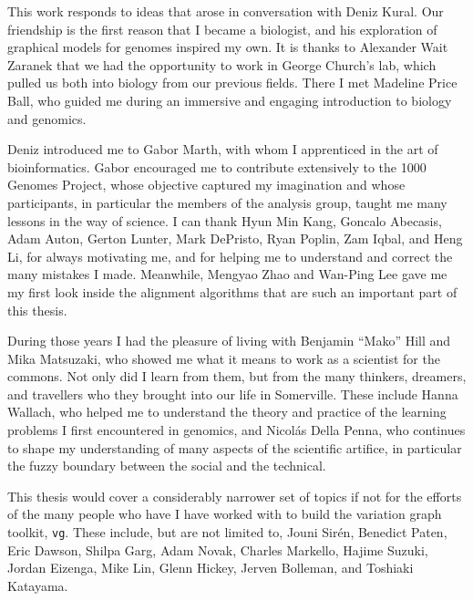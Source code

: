 
\begin{acknowledgements}      

  This work responds to ideas that arose in conversation with Deniz Kural.
  Our friendship is the first reason that I became a biologist, and his exploration of graphical models for genomes inspired my own.
  It is thanks to Alexander Wait Zaranek that we had the opportunity to work in George Church's lab, which pulled us both into biology from our previous fields.
  There I met Madeline Price Ball, who guided me during an immersive and engaging introduction to biology and genomics.
  
  Deniz introduced me to Gabor Marth, with whom I apprenticed in the art of bioinformatics.
  Gabor encouraged me to contribute extensively to the 1000 Genomes Project, whose objective captured my imagination and whose participants, in particular the members of the analysis group, taught me many lessons in the way of science.
  I can thank Hyun Min Kang, Goncalo Abecasis, Adam Auton, Gerton Lunter, Mark DePristo, Ryan Poplin, Zam Iqbal, and Heng Li, for always motivating me, and for helping me to understand and correct the many mistakes I made.
  Meanwhile, Mengyao Zhao and Wan-Ping Lee gave me my first look inside the alignment algorithms that are such an important part of this thesis.

  During those years I had the pleasure of living with Benjamin ``Mako'' Hill and Mika Matsuzaki, who showed me what it means to work as a scientist for the commons.
  Not only did I learn from them, but from the many thinkers, dreamers, and travellers who they brought into our life in Somerville.
  These include Hanna Wallach, who helped me to understand the theory and practice of the learning problems I first encountered in genomics, and Nicol\'{a}s Della Penna, who continues to shape my understanding of many aspects of the scientific artifice, in particular the fuzzy boundary between the social and the technical.
  
  This thesis would cover a considerably narrower set of topics if not for the efforts of the many people who have I have worked with to build the variation graph toolkit, {\tt vg}.
  These include, but are not limited to,
  Jouni Sir\'{e}n,
  Benedict Paten,
  Eric Dawson,
  Shilpa Garg,
  Adam Novak,
  Charles Markello,
  Hajime Suzuki,
  Jordan Eizenga,
  Mike Lin,
  Glenn Hickey,
  Jerven Bolleman,
  and Toshiaki Katayama.


\end{acknowledgements}
